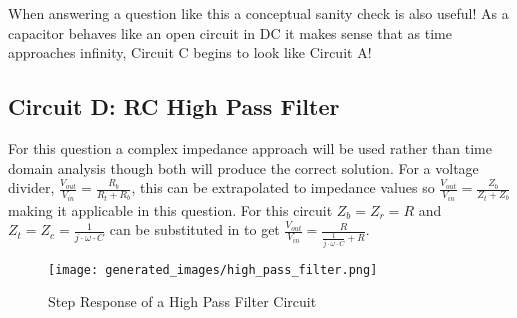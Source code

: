 \documentclass[main.tex]{subfiles}
\begin{document}

When answering a question like this a conceptual sanity check is also useful! As a capacitor behaves like an open circuit in DC it makes sense that as time approaches infinity, Circuit C begins to look like Circuit A! 

\subsection{Circuit D: RC High Pass Filter}
For this question a complex impedance approach will be used rather than time domain analysis though both will produce the correct solution. For a voltage divider, $\frac{V_{out}}{V_{in}} = \frac{R_b}{R_t + R_b}$, this can be extrapolated to impedance values so $\frac{V_{out}}{V_{in}} = \frac{Z_b}{Z_t + Z_b}$ making it applicable in this question. For this circuit $Z_b = Z_r = R$ and $Z_t = Z_c = \frac{1}{j \cdot \omega \cdot C}$ can be substituted in to get $\frac{V_{out}}{V_{in}} = \frac{R}{\frac{1}{j \cdot \omega \cdot C} + R}$.


\begin{figure}[H]
    \centering
    \texttt{[image: generated\_images/high\_pass\_filter.png]}
    \caption{Step Response of a High Pass Filter Circuit}
    \label{fig:step-response-high-pass-filter}
\end{figure}




\end{document}
